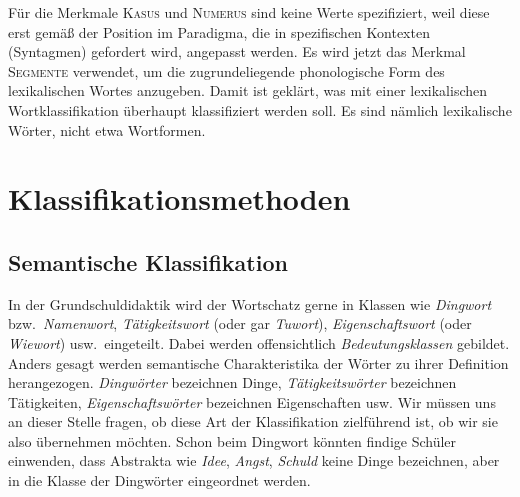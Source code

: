 Für die Merkmale \textsc{Kasus} und \textsc{Numerus} sind keine Werte spezifiziert, weil diese erst gemäß der Position im Paradigma, die in spezifischen Kontexten (Syntagmen) gefordert wird, angepasst werden.
Es wird jetzt das Merkmal \textsc{Segmente} verwendet, um die zugrundeliegende phonologische Form des lexikalischen Wortes anzugeben.
Damit ist geklärt, was mit einer lexikalischen Wortklassifikation überhaupt klassifiziert werden soll.
Es sind nämlich lexikalische Wörter, nicht etwa Wortformen.




\section{Klassifikationsmethoden}

\label{sec:klassifikationsmethoden}

\subsection{Semantische Klassifikation}

\label{sec:semantischeklassifikation}


In der Grundschuldidaktik wird der Wortschatz gerne in Klassen wie \textit{Dingwort} bzw.\ \textit{Namenwort}, \textit{Tätigkeitswort} (oder gar \textit{Tuwort}), \textit{Eigenschaftswort} (oder \textit{Wiewort}) usw.\ eingeteilt.
Dabei werden offensichtlich \textit{Bedeutungsklassen} gebildet.
Anders gesagt werden semantische Charakteristika der Wörter zu ihrer Definition herangezogen.
\textit{Dingwörter} bezeichnen Dinge, \textit{Tätigkeitswörter} bezeichnen Tätigkeiten, \textit{Eigenschaftswörter} bezeichnen Eigenschaften usw.
Wir müssen uns an dieser Stelle fragen, ob diese Art der Klassifikation zielführend ist, ob wir sie also übernehmen möchten.
Schon beim Dingwort könnten findige Schüler einwenden, dass Abstrakta wie \textit{Idee}, \textit{Angst}, \textit{Schuld} keine Dinge bezeichnen, aber in die Klasse der Dingwörter eingeordnet werden.

